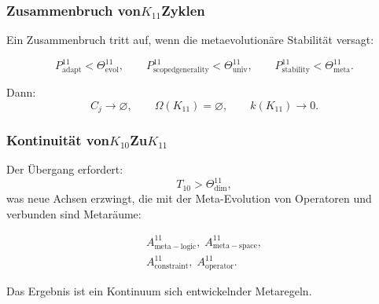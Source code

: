 \subsubsection{Zusammenbruch von$K_{11}$Zyklen}

Ein Zusammenbruch tritt auf, wenn die metaevolutionäre Stabilität versagt:

\[
   P^{11}_{\mathrm{adapt}} < \Theta^{11}_{\mathrm{evol}},\qquad
   P^{11}_{\mathrm{scoped generality}} < \Theta^{11}_{\mathrm{univ}},\qquad
   P^{11}_{\mathrm{stability}} < \Theta^{11}_{\mathrm{meta}}.
\]

Dann:
\[
  C_j\to\varnothing,\qquad
  \Omega(K_{11})=\varnothing,\qquad
  k(K_{11})\to 0.
\]


\subsubsection{Kontinuität von$K_{10}$Zu$K_{11}$}

Der Übergang erfordert:
\[
  T_{10}>\Theta^{11}_{\mathrm{dim}},
\]
was neue Achsen erzwingt, die mit der Meta-Evolution von Operatoren und verbunden sind
Metaräume:

\[
  \begin{aligned}
  A^{11}_{\mathrm{meta\!-\!logic}},\;
  A^{11}_{\mathrm{meta\!-\!space}},\\
  A^{11}_{\mathrm{constraint}},\;
  A^{11}_{\mathrm{operator}}.
  \end{aligned}
\]

Das Ergebnis ist ein Kontinuum sich entwickelnder Metaregeln.
